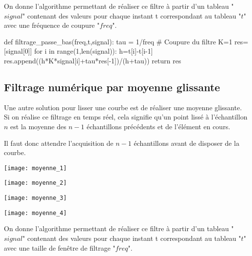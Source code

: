 On donne l'algorithme permettant de réaliser ce filtre à partir d'un tableau "$signal$" contenant des valeurs pour chaque instant t correspondant au tableau "$t$" avec une fréquence de coupure "$freq$".

\begin{pyverbatim}
def filtrage_passe_bas(freq,t,signal):
    tau = 1/freq # Coupure du filtre
    K=1
    res=[signal[0]]
    for i in range(1,len(signal)):
        h=t[i]-t[i-1]
        res.append((h*K*signal[i]+tau*res[-1])/(h+tau))
    return res
\end{pyverbatim}

\subsection{Filtrage numérique par moyenne glissante}
Une autre solution pour lisser une courbe est de réaliser une moyenne glissante. Si on réalise ce filtrage en temps réel, cela signifie qu'un point lissé à l'échantillon $n$ est la moyenne des $n-1$ échantillons précédents et de l'élément en cours. 

Il faut donc attendre l'acquisition de $n-1$ échantillons avant de disposer de la courbe.


\begin{minipage}[c]{.43\linewidth}
\begin{center}
\texttt{[image: moyenne\_1]}
\end{center}
\end{minipage} \hfill
\begin{minipage}[c]{.43\linewidth}
\begin{center}
\texttt{[image: moyenne\_2]}
\end{center}
\end{minipage} 

\begin{minipage}[c]{.43\linewidth}
\begin{center}
\texttt{[image: moyenne\_3]}
\end{center}
\end{minipage} \hfill
\begin{minipage}[c]{.43\linewidth}
\begin{center}
\texttt{[image: moyenne\_4]}
\end{center}
\end{minipage}

On donne l'algorithme permettant de réaliser ce filtre à partir d'un tableau "$signal$" contenant des valeurs pour chaque instant t correspondant au tableau "$t$" avec une taille de fenêtre de filtrage "$freq$".


